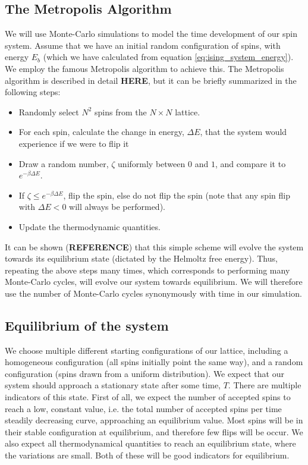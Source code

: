 \documentclass[a4paper, 10pt]{article}
\begin{document}
\subsection{The Metropolis Algorithm}\label{Monte-Carlo_algo}
We will use Monte-Carlo simulations to model the time development of our spin system. Assume that we have an initial random configuration of spins, with energy $E_b$ (which we have calculated from equation \ref{eq:ising_system_energy}). We employ the famous Metropolis algorithm to achieve this. The Metropolis algorithm is described in detail \textbf{HERE}, but it can be briefly summarized in the following steps:
\begin{itemize}
\item Randomly select $N^2$ spins from the $N\times N$ lattice.
\item For each spin, calculate the change in energy, $\Delta E$, that the system would experience if we were to flip it
\item Draw a random number, $\zeta$ uniformly between $0$ and $1$, and compare it to $e^{-\beta \Delta E}$. \item If $\zeta \leq e^{-\beta \Delta E}$, flip the spin, else do not flip the spin (note that any spin flip with $\Delta E < 0$ will always be performed).
\item Update the thermodynamic quantities.
\end{itemize}
It can be shown (\textbf{REFERENCE}) that this simple scheme will evolve the system towards its equilibrium state (dictated by the Helmoltz free energy). Thus, repeating the above steps many times, which corresponds to performing many Monte-Carlo cycles, will evolve our system towards equilibrium. We will therefore use the number of Monte-Carlo cycles synonymously with time in our simulation.
\subsection{Equilibrium of the system}\label{equilibrium_system}
We choose multiple different starting configurations of our lattice, including a homogeneous configuration (all spins initially point the same way), and a random configuration (spins drawn from a uniform distribution). We expect that our system should approach a stationary state after some time, $T$. There are multiple indicators of this state. First of all, we expect the number of accepted spins to reach a low, constant value, i.e. the total number of accepted spins  per time steadily decreasing curve, approaching an equilibrium value. Most spins will be in their stable configuration at equilibrium, and therefore few flips will be occur. We also expect all thermodynamical quantities to reach an equilibrium state, where the variations are small. Both of these will be good indicators for equilibrium. 
\end{document}

